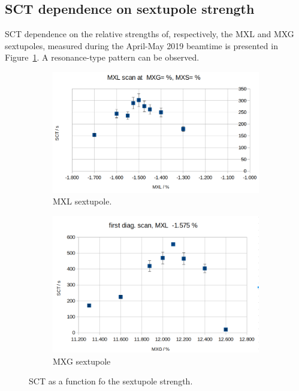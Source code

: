 \subsection{SCT dependence on sextupole strength}
SCT dependence on the relative strengths of, respectively, the 
MXL and MXG sextupoles, measured during the April-May 2019 beamtime
is presented in Figure~\ref{fig:SCT_scan}. A resonance-type pattern can be observed.

\begin{figure}[h]\centering
	\begin{subfigure}{\linewidth}
		\includegraphics[height=.35\paperheight]{images/chapter4/SCT-April-2019/MXL_scan}
		\caption{MXL sextupole.}
	\end{subfigure}
	\begin{subfigure}{\linewidth}
		\includegraphics[width=.6\paperheight]{images/chapter4/SCT-April-2019/MXG_scan}
		\caption{MXG sextupole}
	\end{subfigure}
	\caption{SCT as a function fo the sextupole strength.\label{fig:SCT_scan}}
\end{figure}


